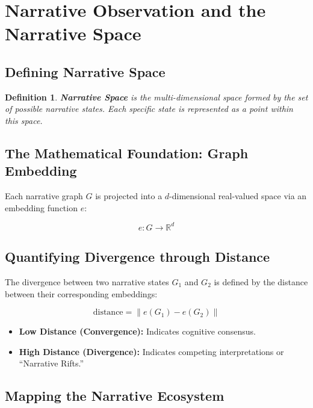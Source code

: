 \documentclass[11pt,a4paper]{article}
\newtheorem{definition}{Definition}
\begin{document}
\section{Narrative Observation and the Narrative Space}

\subsection{Defining Narrative Space}

\begin{definition}
\textbf{Narrative Space} is the multi-dimensional space formed by the
set of possible narrative states. Each specific state is represented as
a point within this space.
\end{definition}

\subsection{The Mathematical Foundation: Graph Embedding}

Each narrative graph $G$ is projected into a $d$-dimensional
real-valued space via an embedding function $e$:

\begin{equation}
  e : G \rightarrow \mathbb{R}^d
\end{equation}

\subsection{Quantifying Divergence through Distance}

The divergence between two narrative states $G_1$ and $G_2$ is defined
by the distance between their corresponding embeddings:

\begin{equation}
  \text{distance} = \| e(G_1) - e(G_2) \|
\end{equation}

\begin{itemize}[noitemsep]
  \item \textbf{Low Distance (Convergence):} Indicates cognitive consensus.
  \item \textbf{High Distance (Divergence):} Indicates competing interpretations or ``Narrative Rifts.''
\end{itemize}

\subsection{Mapping the Narrative Ecosystem}
\end{document}
